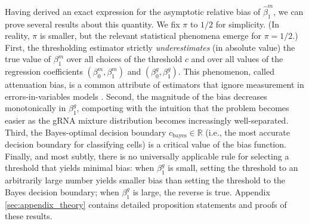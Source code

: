 \documentclass[12pt]{article}
\begin{document}
Having derived an exact expression for the asymptotic relative bias of $\hat{\beta}^m_1$, we can prove several results about this quantity. We fix $\pi$ to $1/2$ for simplicity. (In reality, $\pi$ is smaller, but the relevant statistical phenomena emerge for $\pi = 1/2$.) First, the thresholding estimator strictly \textit{underestimates} (in absolute value) the true value of $\beta^m_1$ over all choices of the threshold $c$ and over all values of the regression coefficients $(\beta^m_0, \beta^m_1)$ and $(\beta^g_0, \beta^g_1)$. This phenomenon, called attenuation bias, is a common attribute of estimators that ignore measurement in errors-in-variables models \parencite{Stefanski2000a}. Second, the magnitude of the bias decreases monotonically in $\beta^g_1$, comporting with the intuition that the problem becomes easier as the gRNA mixture distribution becomes increasingly well-separated. Third, the Bayes-optimal decision boundary $c_\textrm{bayes} \in \mathbb{R}$ (i.e., the most accurate decision boundary for classifying cells) is a critical value of the bias function. Finally, and most subtly, there is no universally applicable rule for selecting a threshold that yields minimal bias: when $\beta^g_1$ is small, setting the threshold to an arbitrarily large number yields smaller bias than setting the threshold to the Bayes decision boundary; when $\beta^g_1$ is large, the reverse is true. Appendix \ref{sec:appendix_theory} contains detailed proposition statements and proofs of these results.
\end{document}
